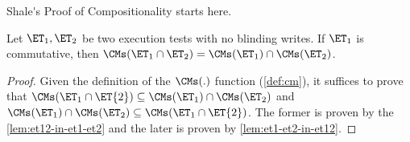 \ac{Shale's Proof of Compositionality starts here.}

\begin{theorem}
\label{thm:appendix-et-composition-1}
Let $\ET_1, \ET_2$ be two execution tests with no blinding writes. 
If $\ET_1$ is commutative, then $\CMs(\ET_1 \cap \ET_2) = \CMs(\ET_1) \cap \CMs(\ET_2)$. 
\end{theorem}
\begin{proof}
Given the definition of the \( \CMs(.) \) function (\cref{def:cm}), 
it suffices to prove that \( \CMs(\ET_{1} \cap \ET{2}) \subseteq \CMs(\ET_1) \cap \CMs(\ET_2) \)
and \( \CMs(\ET_1) \cap \CMs(\ET_2) \subseteq \CMs(\ET_{1} \cap \ET{2}) \).
The former is proven by the \cref{lem:et12-in-et1-et2} and the later is proven by \cref{lem:et1-et2-in-et12}.
\end{proof}

